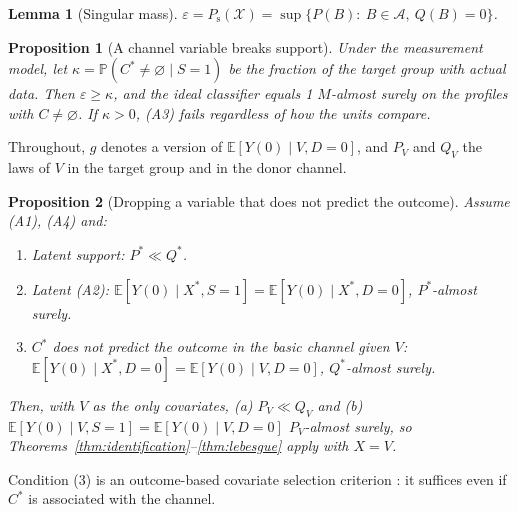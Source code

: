 \documentclass[twoside,11pt]{article}
\newcommand{\E}{\mathbb{E}}
\newcommand{\PP}{\mathbb{P}}
\newcommand{\X}{\mathcal{X}}
\newcommand{\A}{\mathcal{A}}
\newcommand{\Ps}{P_{\mathrm{s}}}
\newcommand{\vacio}{\varnothing}
\theoremstyle{plain}
\newtheorem{proposition}{Proposition}
\newtheorem{lemma}{Lemma}
\theoremstyle{definition}
\begin{document}
\begin{lemma}[Singular mass]\label{lem:singular}
$\varepsilon=\Ps(\X)=\sup\{P(B):\ B\in\A,\ Q(B)=0\}$.
\end{lemma}

\begin{proposition}[A channel variable breaks support]\label{prop:breaks}
Under the measurement model, let $\kappa=\PP(C^*\ne\vacio\mid S=1)$ be the fraction of the target group with actual data. Then $\varepsilon\ge\kappa$, and the ideal classifier equals 1 $M$-almost surely on the profiles with $C\ne\vacio$. If $\kappa>0$, (A3) fails regardless of how the units compare.
\end{proposition}

Throughout, $g$ denotes a version of $\E[Y(0)\mid V,D=0]$, and $P_V$ and $Q_V$ the laws of $V$ in the target group and in the donor channel.

\begin{proposition}[Dropping a variable that does not predict the outcome]\label{prop:drop}
Assume (A1), (A4) and:
\begin{enumerate}
  \item \emph{Latent support:} $P^*\ll Q^*$.
  \item \emph{Latent (A2):} $\E[Y(0)\mid X^*,S=1]=\E[Y(0)\mid X^*,D=0]$, $P^*$-almost surely.
  \item \emph{$C^*$ does not predict the outcome in the basic channel given $V$:} $\E[Y(0)\mid X^*,D=0]=\E[Y(0)\mid V,D=0]$, $Q^*$-almost surely.
\end{enumerate}
Then, with $V$ as the only covariates, (a) $P_V\ll Q_V$ and (b) $\E[Y(0)\mid V,S=1]=\E[Y(0)\mid V,D=0]$ $P_V$-almost surely, so Theorems~\ref{thm:identification}--\ref{thm:lebesgue} apply with $X=V$.
\end{proposition}

Condition (3) is an outcome-based covariate selection criterion \citep{deluna2011}: it suffices even if $C^*$ is associated with the channel.
\end{document}
